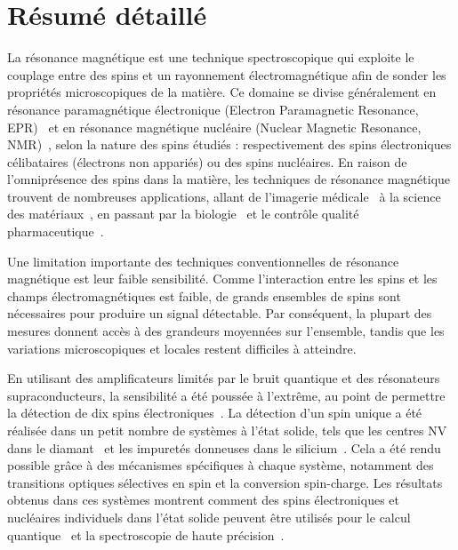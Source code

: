 \chapter{Résumé détaillé}
La résonance magnétique est une technique spectroscopique qui exploite le couplage entre des spins et un rayonnement électromagnétique afin de sonder les propriétés microscopiques de la matière. Ce domaine se divise généralement en résonance paramagnétique électronique (Electron Paramagnetic Resonance, EPR)~ et en résonance magnétique nucléaire (Nuclear Magnetic Resonance, NMR)~, selon la nature des spins étudiés : respectivement des spins électroniques célibataires (électrons non appariés) ou des spins nucléaires. En raison de l'omniprésence des spins dans la matière, les techniques de résonance magnétique trouvent de nombreuses applications, allant de l'imagerie médicale~ à la science des matériaux~, en passant par la biologie~ et le contrôle qualité pharmaceutique~.

Une limitation importante des techniques conventionnelles de résonance magnétique est leur faible sensibilité. Comme l'interaction entre les spins et les champs électromagnétiques est faible, de grands ensembles de spins sont nécessaires pour produire un signal détectable. Par conséquent, la plupart des mesures donnent accès à des grandeurs moyennées sur l'ensemble, tandis que les variations microscopiques et locales restent difficiles à atteindre.

En utilisant des amplificateurs limités par le bruit quantique et des résonateurs supraconducteurs, la sensibilité a été poussée à l'extrême, au point de permettre la détection de dix spins électroniques~. La détection d'un spin unique a été réalisée dans un petit nombre de systèmes à l'état solide, tels que les centres NV dans le diamant~ et les impuretés donneuses dans le silicium~. Cela a été rendu possible grâce à des mécanismes spécifiques à chaque système, notamment des transitions optiques sélectives en spin et la conversion spin-charge. Les résultats obtenus dans ces systèmes montrent comment des spins électroniques et nucléaires individuels dans l'état solide peuvent être utilisés pour le calcul quantique~ et la spectroscopie de haute précision~.

